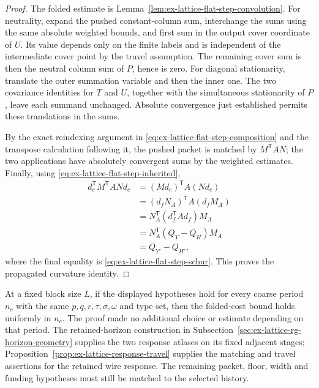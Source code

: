 \begin{proof}
The folded estimate is Lemma~\ref{lem:ex-lattice-flat-step-convolution}.
For neutrality, expand the pushed constant-column sum, interchange the sums
using the same absolute weighted bounds, and first sum in the output cover
coordinate of $U$. Its value depends only on the finite labels and is
independent of the intermediate cover point by the travel assumption. The
remaining cover sum is then the neutral column sum of $P$, hence is zero.
For diagonal stationarity, translate the outer summation variable and then
the inner one. The two covariance identities for $T$ and $U$, together with
the simultaneous stationarity of $P$, leave each summand unchanged. Absolute
convergence just established permits these translations in the sums.

By the exact reindexing argument in
\eqref{eq:ex-lattice-flat-step-composition} and the transpose calculation
following it, the pushed packet is matched by $M^{\mathsf T}AN$; the two
applications have absolutely convergent sums by the weighted estimates.
Finally, using \eqref{eq:ex-lattice-flat-step-inherited},
\[
\begin{split}
 d_c^{\mathsf T}M^{\mathsf T}ANd_c
 &= (Md_c)^{\mathsf T}A(Nd_c)\\
 &= (d_fN_A)^{\mathsf T}A(d_fM_A)\\
 &= N_A^{\mathsf T}(d_f^{\mathsf T}Ad_f)M_A\\
 &= N_A^{\mathsf T}(Q_Y-Q_H)M_A\\
 &=Q_{Y'}-Q_{H'},
\end{split}
\]
where the final equality is \eqref{eq:ex-lattice-flat-step-schur}. This proves
the propagated curvature identity.\end{proof}

At a fixed block size $L$, if the displayed hypotheses hold for every coarse
period $n_c$ with the same $p,q,r,\tau,\sigma,\omega$ and type set, then the
folded-cost bound holds uniformly in $n_c$. The proof made no additional choice
or estimate depending on that period. The retained-horizon construction in
Subsection~\ref{sec:ex-lattice-rg-horizon-geometry} supplies the two response
atlases on its fixed adjacent stages; Proposition~\ref{prop:ex-lattice-response-travel}
supplies the matching and travel assertions for the retained wire response.
The remaining packet, floor, width and funding hypotheses must still be
matched to the selected history.

